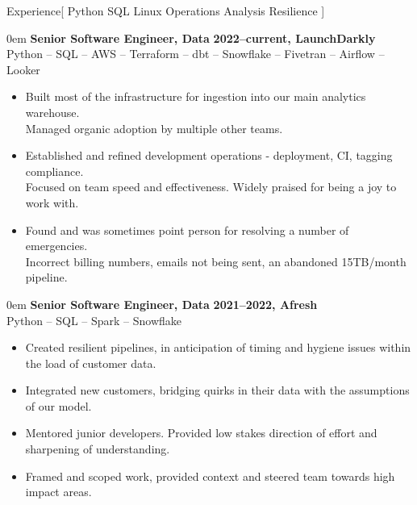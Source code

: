 \documentclass[11pt,a4paper]{article}
\newenvironment{worksection}[3]{
    \begin{addmargin}[0.5em]{0em}
    {\large\bfseries #1} \hfill {\bfseries #2}\\%
    \hspace*{1em}#3
    \begin{itemize}
        [label=-, topsep=0pt, itemsep=0.5ex, parsep=0pt, leftmargin=1em]
}{
    \end{itemize}
    \end{addmargin}
    \medskip
}
\begin{document}
\sloppy  %


\vspace{1em}

\begin{mysection}{Experience}[
    Python
    \textbullet{} SQL
    \textbullet{} Linux
    \textbullet{} Operations
    \textbullet{} Analysis
    \textbullet{} Resilience
]

  \begin{worksection}
        {Senior Software Engineer, Data}
        {2022--current, LaunchDarkly}
        {Python -- SQL -- AWS -- Terraform -- dbt -- Snowflake -- Fivetran -- Airflow -- Looker}


    \item Built most of the infrastructure for ingestion into our main analytics
          warehouse.
    \\    Managed organic adoption by multiple other teams.

    \item Established and refined development operations - deployment, CI,
          tagging compliance.
    \\    Focused on team speed and effectiveness.
          Widely praised for being a joy to work with.

    \item Found and was sometimes point person for resolving a number of
          emergencies.
    \\    Incorrect billing numbers, emails not being sent,
          an abandoned 15TB/month pipeline.

  \end{worksection}

  \begin{worksection}
        {Senior Software Engineer, Data}
        {2021--2022, Afresh}
        {Python -- SQL -- Spark -- Snowflake}

    \item Created resilient pipelines, in anticipation of timing and hygiene
          issues within the load of customer data.
    \item Integrated new customers, bridging quirks in their data with the
          assumptions of our model.
    \item Mentored junior developers.  Provided low stakes direction of effort
          and sharpening of understanding.
    \item Framed and scoped work, provided context and steered team towards
          high impact areas.


\end{worksection}
\end{mysection}
\end{document}
